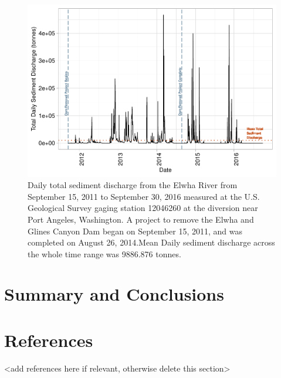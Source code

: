 \documentclass[12pt,]{article}
\begin{document}
\begin{figure}
\centering
\includegraphics{Mason_ENV872_ProjectFinal_files/figure-latex/Intro to Question Figure 2-1.pdf}
\caption{Daily total sediment discharge from the Elwha River from
September 15, 2011 to September 30, 2016 measured at the U.S. Geological
Survey gaging station 12046260 at the diversion near Port Angeles,
Washington. A project to remove the Elwha and Glines Canyon Dam began on
September 15, 2011, and was completed on August 26, 2014.Mean Daily
sediment discharge across the whole time range was 9886.876 tonnes.}
\end{figure}

\newpage

\hypertarget{summary-and-conclusions}{%
\section{Summary and Conclusions}\label{summary-and-conclusions}}

\newpage

\hypertarget{references}{%
\section{References}\label{references}}

\textless{}add references here if relevant, otherwise delete this
section\textgreater{}
\end{document}
